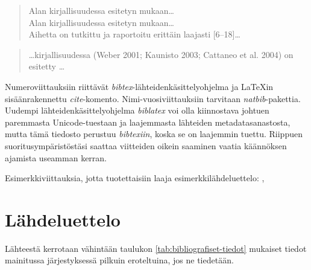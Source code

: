 \documentclass[globalnumbering,centeredcaptions,draftfooter]{tutthesis/tutthesis} %
\begin{document}
  \begin{quotation}
  Alan kirjallisuudessa \cite{Weber2001,Cattaneo2004,Kaunisto2003} esitetyn mukaan\ldots\\
  Alan kirjallisuudessa \cite{Weber2001}\cite{Cattaneo2004}\cite{Kaunisto2003} esitetyn mukaan\ldots\\
  Aihetta on tutkittu ja raportoitu erittäin laajasti [6--18]\ldots %
  \end{quotation}
    
  \begin{quotation}
  \ldots kirjallisuudessa (Weber 2001; Kaunisto 2003; Cattaneo et al. 2004) on esitetty \ldots
  \end{quotation}
\fi

Numeroviittauksiin riittävät \emph{bibtex}-lähteidenkäsittelyohjelma ja LaTeXin sisäänrakennettu \emph{cite}-komento.
Nimi-vuosiviittauksiin tarvitaan \emph{natbib}-pakettia.
Uudempi lähteidenkäsittelyohjelma \emph{biblatex} voi olla kiinnostava johtuen paremmasta Unicode-tuestaan ja laajemmasta lähteiden metadatasanastosta, mutta tämä tiedosto perustuu \emph{bibtexiin}, koska se on laajemmin tuettu.
Riippuen suoritusympäristöstäsi saattaa viitteiden oikein saaminen vaatia käännöksen ajamista useamman kerran.

Esimerkkiviittauksia, jotta tuotettaisiin laaja esimerkkilähdeluettelo: \citep{Weber2001} \citep{Cattaneo2004} \citep{Kaunisto2003} \citep{Li2004} \citep{Ho-Ching2003} \citep{Puhakka2004} \citep{Nissinen2011} \citep{Ohlstrom2005} \citep{OMAP4430} \citep{InjectionMolding2005} \citep{Raakakk2002} \citep{Intel2013} \citep{Davies2004} \citep{SFSISO1000A1} \citep{Keskinen2005} \citep{Sahkoturvallisuuslaki1996} \citep{Pan2013} \citep{Tty2005} \citep{ConstInorgComp2005}, \citep{Radionuklidit2003} \citep{Kalkkihiekkatiilet2004} \citep{Miettinen2005}


\section{Lähdeluettelo}

Lähteestä kerrotaan vähintään taulukon \ref{tab:bibliografiset-tiedot} mukaiset tiedot mainitussa järjestyksessä pilkuin eroteltuina, jos ne tiedetään.
\end{document}
